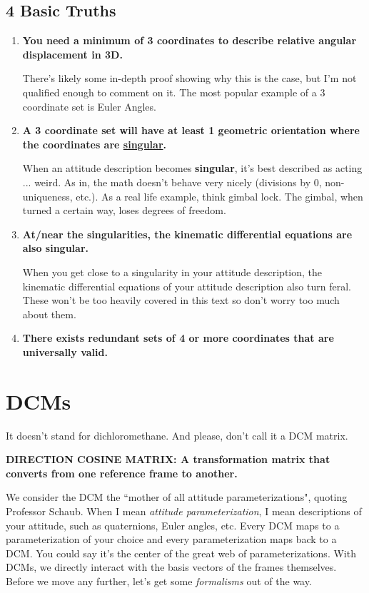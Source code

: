 \documentclass[a4paper,14pt]{extreport}
\begin{document}
\section{4 Basic Truths}
\begin{enumerate}
\item \textbf{You need a minimum of 3 coordinates to describe relative angular displacement in 3D.} 

There's likely some in-depth proof showing why this is the case, but I'm not qualified enough to comment on it. The most popular example of a 3 coordinate set is Euler Angles.

\item \textbf{A 3 coordinate set will have at least 1 geometric orientation where the coordinates are \underline{singular}.} 

When an attitude description becomes \textbf{singular}, it's best described as acting ... weird. As in, the math doesn't behave very nicely (divisions by 0, non-uniqueness, etc.). As a real life example, think gimbal lock. The gimbal, when turned a certain way, loses degrees of freedom.

\item \textbf{At/near the singularities, the kinematic differential equations are also singular.} 

When you get close to a singularity in your attitude description, the kinematic differential equations of your attitude description also turn feral. These won't be too heavily covered in this text so don't worry too much about them.

\item \textbf{There exists redundant sets of 4 or more coordinates that are universally valid.}

\end{enumerate}
\chapter{DCMs}

It doesn't stand for dichloromethane. And please, don't call it a DCM matrix.

\begin{center}
\textbf{DIRECTION COSINE MATRIX: A transformation matrix that converts from one reference frame to another.}
\end{center}

We consider the DCM the ``mother of all attitude parameterizations", quoting Professor Schaub. When I mean \emph{attitude parameterization}, I mean descriptions of your attitude, such as quaternions, Euler angles, etc. Every DCM maps to a parameterization of your choice and every parameterization maps back to a DCM. You could say it's the center of the great web of parameterizations. With DCMs, we directly interact with the basis vectors of the frames themselves. Before we move any further, let's get some \emph{formalisms} out of the way.
\end{document}
